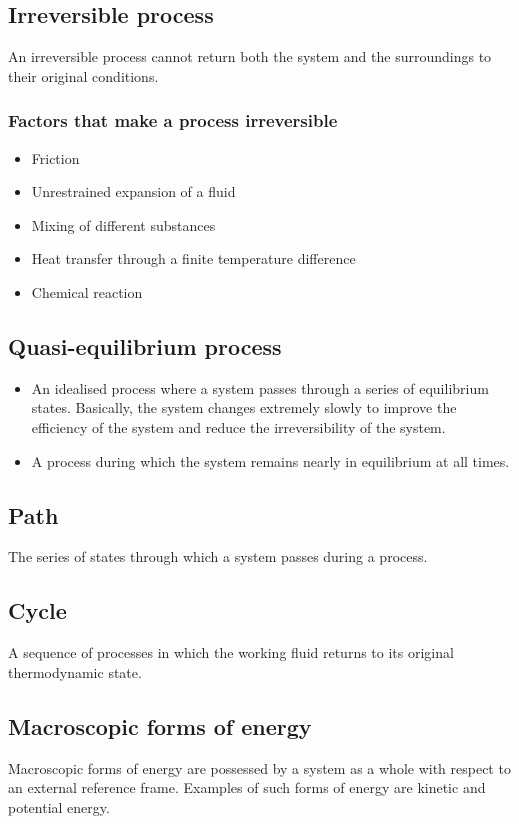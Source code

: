 \documentclass[11pt]{article}
\begin{document}
\newpage
\subsection{Irreversible process}
\label{sec:org24574ab}
An irreversible process cannot return both the system and the surroundings to their original conditions.
\subsubsection{Factors that make a process irreversible}
\label{sec:org1a6565c}
\begin{itemize}
\item Friction
\item Unrestrained expansion of a fluid
\item Mixing of different substances
\item Heat transfer through a finite temperature difference
\item Chemical reaction
\end{itemize}
\subsection{Quasi-equilibrium process}
\label{sec:org1dba050}
\begin{itemize}
\item An idealised process where a system passes through a series of equilibrium states. Basically, the system changes extremely slowly to improve the efficiency of the system and reduce the irreversibility of the system.
\item A process during which the system remains nearly in equilibrium at all times.
\end{itemize}
\subsection{Path}
\label{sec:org391babd}
The series of states through which a system passes during a process.
\subsection{Cycle}
\label{sec:org3d2e37c}
A sequence of processes in which the working fluid returns to its original thermodynamic state.
\subsection{Macroscopic forms of energy}
\label{sec:org62ab162}
Macroscopic forms of energy are possessed by a system as a whole with respect to an external reference frame. Examples of such forms of energy are kinetic and potential energy.
\end{document}
